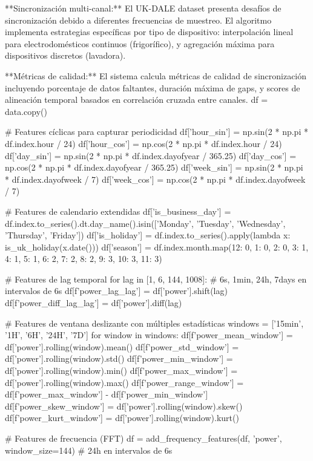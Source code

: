**Sincronización multi-canal:** El UK-DALE dataset presenta desafíos de sincronización debido a diferentes frecuencias de muestreo. El algoritmo implementa estrategias específicas por tipo de dispositivo: interpolación lineal para electrodomésticos continuos (frigorífico), y agregación máxima para dispositivos discretos (lavadora).

**Métricas de calidad:** El sistema calcula métricas de calidad de sincronización incluyendo porcentaje de datos faltantes, duración máxima de gaps, y scores de alineación temporal basados en correlación cruzada entre canales.
    df = data.copy()
    
    # Features cíclicas para capturar periodicidad
    df['hour_sin'] = np.sin(2 * np.pi * df.index.hour / 24)
    df['hour_cos'] = np.cos(2 * np.pi * df.index.hour / 24)
    df['day_sin'] = np.sin(2 * np.pi * df.index.dayofyear / 365.25)
    df['day_cos'] = np.cos(2 * np.pi * df.index.dayofyear / 365.25)
    df['week_sin'] = np.sin(2 * np.pi * df.index.dayofweek / 7)
    df['week_cos'] = np.cos(2 * np.pi * df.index.dayofweek / 7)
    
    # Features de calendario extendidas
    df['is_business_day'] = df.index.to_series().dt.day_name().isin(['Monday', 'Tuesday', 'Wednesday', 'Thursday', 'Friday'])
    df['is_holiday'] = df.index.to_series().apply(lambda x: is_uk_holiday(x.date()))
    df['season'] = df.index.month.map({12: 0, 1: 0, 2: 0, 3: 1, 4: 1, 5: 1, 6: 2, 7: 2, 8: 2, 9: 3, 10: 3, 11: 3})
    
    # Features de lag temporal
    for lag in [1, 6, 144, 1008]:  # 6s, 1min, 24h, 7days en intervalos de 6s
        df[f'power_lag_{lag}'] = df['power'].shift(lag)
        df[f'power_diff_lag_{lag}'] = df['power'].diff(lag)
    
    # Features de ventana deslizante con múltiples estadísticas
    windows = ['15min', '1H', '6H', '24H', '7D']
    for window in windows:
        df[f'power_mean_{window}'] = df['power'].rolling(window).mean()
        df[f'power_std_{window}'] = df['power'].rolling(window).std()
        df[f'power_min_{window}'] = df['power'].rolling(window).min()
        df[f'power_max_{window}'] = df['power'].rolling(window).max()
        df[f'power_range_{window}'] = df[f'power_max_{window}'] - df[f'power_min_{window}']
        df[f'power_skew_{window}'] = df['power'].rolling(window).skew()
        df[f'power_kurt_{window}'] = df['power'].rolling(window).kurt()
    
    # Features de frecuencia (FFT)
    df = add_frequency_features(df, 'power', window_size=144)  # 24h en intervalos de 6s
    
